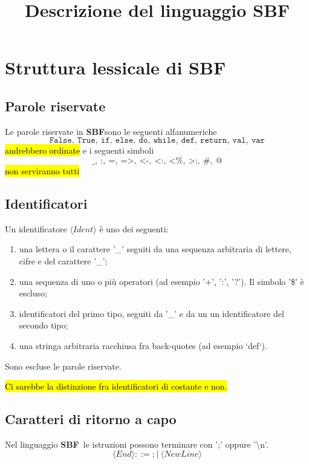 \documentclass[11pt,a4paper,italian]{article}
\title{Descrizione del linguaggio SBF}
\newcommand{\SBF}{\textbf{SBF}}
\newcommand{\token}[1]{\langle \mathit{#1} \rangle }
\newcommand{\False}{\texttt{False}}
\newcommand{\True}{\texttt{True}}
\newcommand{\If}{\texttt{if}}
\newcommand{\Else}{\texttt{else}}
\newcommand{\Do}{\texttt{do}}
\newcommand{\While}{\texttt{while}}
\newcommand{\Def}{\texttt{def}}
\newcommand{\Return}{\texttt{return}}
\newcommand{\Val}{\texttt{val}}
\newcommand{\Var}{\texttt{var}}
\begin{document}
	\maketitle
	
	\section{Struttura lessicale di \SBF}
	\subsection*{Parole riservate}
	Le parole riservate in \SBF sono le seguenti alfanumeriche
	\begin{equation}
	\False,\ \True,\ \If,\ \Else,\ \Do,\ \While,\ \Def,\ \Return,\ \Val,\ \Var
	\end{equation}
	\hl{andrebbero ordinate}
	e i seguenti simboli
	\begin{equation}
	\texttt{\_},\ \texttt{:},\ \texttt{=},\ \texttt{=>},\ \texttt{<-},\ \texttt{<:},\ \texttt{<\%},\ \texttt{>:},\ \texttt{\#},\ \texttt{@}
	\end{equation}
	\hl{non serviranno tutti}
	
	\subsection*{Identificatori}
	Un identificatore $\token{Ident}$ è uno dei seguenti:
	\begin{enumerate}
		\item una lettera o il carattere '\_' seguiti da una sequenza arbitraria di lettere, cifre e del carattere '\_';
		\item una sequenza di uno o più operatori (ad esempio '+', ':', '?'). Il simbolo '\$' è escluso;
		\item identificatori del primo tipo, seguiti da '\_' e da un un identificatore del secondo tipo;
		\item una stringa arbitraria racchiusa fra back-quotes (ad esempio `def`).
	\end{enumerate}
	Sono escluse le parole riservate.
	
	\hl{Ci sarebbe la distinzione fra identificatori di costante e non.}
	
	\subsection*{Caratteri di ritorno a capo}
	Nel linguaggio \SBF\ le istruzioni possono terminare con ';' oppure '\textbackslash n'. 
	\begin{equation*}
	\token{End} ::= \texttt{;}\ |\ \token{NewLine}
	\end{equation*}
	
\end{document}
